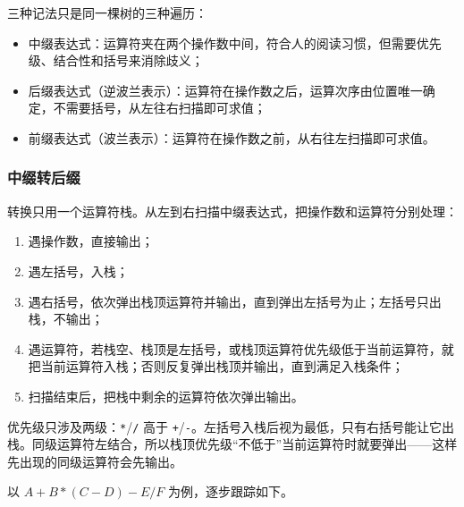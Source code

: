 三种记法只是同一棵树的三种遍历：
\begin{itemize}
    \item 中缀表达式：运算符夹在两个操作数中间，符合人的阅读习惯，但需要优先级、结合性和括号来消除歧义；
    \item 后缀表达式（逆波兰表示）：运算符在操作数之后，运算次序由位置唯一确定，不需要括号，从左往右扫描即可求值；
    \item 前缀表达式（波兰表示）：运算符在操作数之前，从右往左扫描即可求值。
\end{itemize}

\subsubsection*{中缀转后缀}

转换只用一个运算符栈。从左到右扫描中缀表达式，把操作数和运算符分别处理：

\begin{enumerate}
    \item 遇操作数，直接输出；
    \item 遇左括号，入栈；
    \item 遇右括号，依次弹出栈顶运算符并输出，直到弹出左括号为止；左括号只出栈，不输出；
    \item 遇运算符，若栈空、栈顶是左括号，或栈顶运算符优先级低于当前运算符，就把当前运算符入栈；否则反复弹出栈顶并输出，直到满足入栈条件；
    \item 扫描结束后，把栈中剩余的运算符依次弹出输出。
\end{enumerate}

优先级只涉及两级：\texttt{*}/\texttt{/} 高于 \texttt{+}/\texttt{-}。左括号入栈后视为最低，只有右括号能让它出栈。同级运算符左结合，所以栈顶优先级“不低于”当前运算符时就要弹出——这样先出现的同级运算符会先输出。

以 $A+B*(C-D)-E/F$ 为例，逐步跟踪如下。

